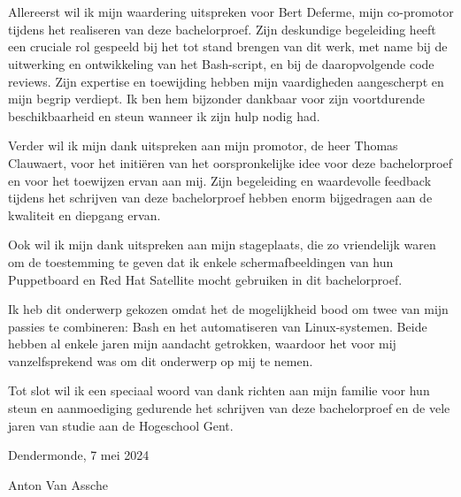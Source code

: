 
\chapter*{}%
\label{ch:voorwoord}


Allereerst wil ik mijn waardering uitspreken voor Bert Deferme, mijn co-promotor tijdens het realiseren van deze bachelorproef.
Zijn deskundige begeleiding heeft een cruciale rol gespeeld bij het tot stand brengen van dit werk, met name bij de uitwerking en ontwikkeling van het Bash-script, en bij de daaropvolgende code reviews.
Zijn expertise en toewijding hebben mijn vaardigheden aangescherpt en mijn begrip verdiept.
Ik ben hem bijzonder dankbaar voor zijn voortdurende beschikbaarheid en steun wanneer ik zijn hulp nodig had.

Verder wil ik mijn dank uitspreken aan mijn promotor, de heer Thomas Clauwaert, voor het initi\"eren van het oorspronkelijke idee voor deze bachelorproef en voor het toewijzen ervan aan mij.
Zijn begeleiding en waardevolle feedback tijdens het schrijven van deze bachelorproef hebben enorm bijgedragen aan de kwaliteit en diepgang ervan.

Ook wil ik mijn dank uitspreken aan mijn stageplaats, die zo vriendelijk waren om de toestemming te geven dat ik enkele schermafbeeldingen van hun Puppetboard en Red Hat Satellite mocht gebruiken in dit bachelorproef.

Ik heb dit onderwerp gekozen omdat het de mogelijkheid bood om twee van mijn passies te combineren: Bash en het automatiseren van Linux-systemen.
Beide hebben al enkele jaren mijn aandacht getrokken, waardoor het voor mij vanzelfsprekend was om dit onderwerp op mij te nemen.

Tot slot wil ik een speciaal woord van dank richten aan mijn familie voor hun steun en aanmoediging gedurende het schrijven van deze bachelorproef en de vele jaren van studie aan de Hogeschool Gent.

Dendermonde, 7 mei 2024

Anton Van Assche
